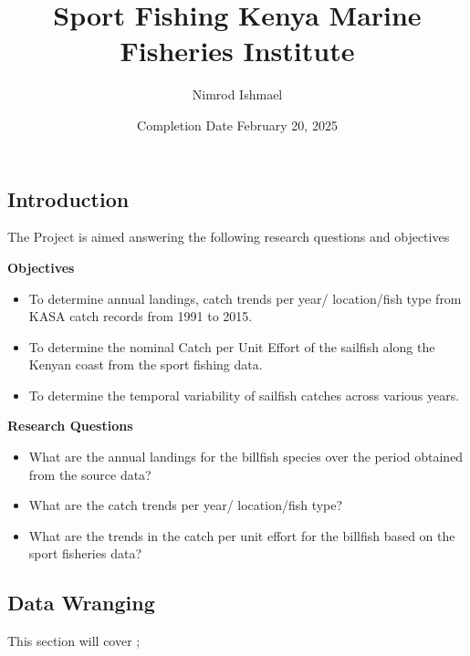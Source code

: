 \documentclass[
]{article}
\title{Sport Fishing Kenya Marine Fisheries Institute}
\author{Nimrod Ishmael}
\date{Completion Date February 20, 2025}
\providecommand{\tightlist}{%
  \setlength{\itemsep}{0pt}\setlength{\parskip}{0pt}}
\begin{document}
\maketitle

\subsection{Introduction}\label{introduction}

The Project is aimed answering the following research questions and
objectives

\textbf{Objectives}

\begin{itemize}
\tightlist
\item
  To determine annual landings, catch trends per year/ location/fish
  type from KASA catch records from 1991 to 2015.
\item
  To determine the nominal Catch per Unit Effort of the sailfish along
  the Kenyan coast from the sport fishing data.
\item
  To determine the temporal variability of sailfish catches across
  various years.
\end{itemize}

\textbf{Research Questions}

\begin{itemize}
\tightlist
\item
  What are the annual landings for the billfish species over the period
  obtained from the source data?
\item
  What are the catch trends per year/ location/fish type?
\item
  What are the trends in the catch per unit effort for the billfish
  based on the sport fisheries data?
\end{itemize}

\subsection{Data Wranging}\label{data-wranging}

This section will cover ;
\end{document}
